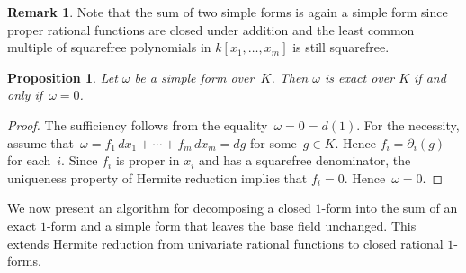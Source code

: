 \documentclass{amsart}
\newtheorem{prop}[thm]{Proposition}
\theoremstyle{definition}
\newtheorem{remark}[thm]{Remark}
\numberwithin{equation}{section}
\numberwithin{thm}{section}
\begin{document}
\begin{remark}\label{RMK:sumsimple}  Note that the sum of two simple forms is again a simple form since proper rational functions are closed under addition and the least common multiple of squarefree polynomials in $k[x_1,\ldots,x_m]$ is still squarefree. 
\end{remark}

\begin{prop}\label{PROP:simpleform}
Let $\omega$ be a simple form over~$K$. Then $\omega$ is exact over $K$ if and only if~$\omega =0$.
\end{prop}
\begin{proof}
    The sufficiency follows from the equality~$\omega = 0= d(1)$. For the necessity, assume that~$\omega=f_1 \, dx_1 + \cdots + f_m \, dx_m = dg$ for some~$g \in K$. Hence $f_i = \partial_i(g)$ for each~$i$. Since $f_i$ is proper in $x_i$ and has a squarefree denominator, the uniqueness property of Hermite reduction implies that $f_i = 0$. Hence~$\omega = 0$.
\end{proof}

We now present an algorithm for decomposing a closed $1$-form into the sum of an exact $1$-form and a simple form that leaves the base field unchanged. This extends Hermite reduction from univariate rational functions to closed rational  $1$-forms. 
\end{document}
